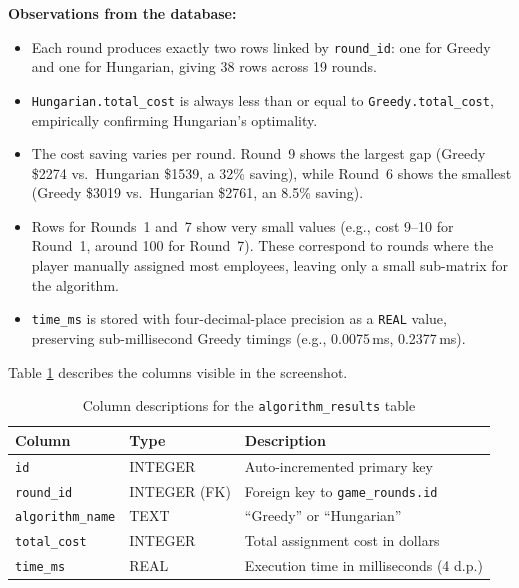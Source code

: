 \documentclass[12pt,a4paper]{article}
\begin{document}
\noindent
\textbf{Observations from the database:}
\begin{itemize}
    \item Each round produces exactly two rows linked by \texttt{round\_id}:
          one for Greedy and one for Hungarian, giving 38 rows across 19 rounds.
    \item \texttt{Hungarian.total\_cost} is always less than or equal to
          \texttt{Greedy.total\_cost}, empirically confirming Hungarian's optimality.
    \item The cost saving varies per round. Round~9 shows the largest gap
          (Greedy \$2274 vs.\ Hungarian \$1539, a 32\% saving), while Round~6 shows
          the smallest (Greedy \$3019 vs.\ Hungarian \$2761, an 8.5\% saving).
    \item Rows for Rounds~1 and~7 show very small values (e.g., cost 9--10 for
          Round~1, around 100 for Round~7). These correspond to rounds where the
          player manually assigned most employees, leaving only a small sub-matrix
          for the algorithm.
    \item \texttt{time\_ms} is stored with four-decimal-place precision as a
          \texttt{REAL} value, preserving sub-millisecond Greedy timings (e.g.,
          0.0075\,ms, 0.2377\,ms).
\end{itemize}

\noindent
Table \ref{tab:db-schema} describes the columns visible in the screenshot.

\begin{table}[H]
    \centering
    \caption{Column descriptions for the \texttt{algorithm\_results} table}
    \label{tab:db-schema}
    \begin{tabularx}{\linewidth}{llX}
        \toprule
        \textbf{Column}          & \textbf{Type}    & \textbf{Description}                             \\
        \midrule
        \texttt{id}              & INTEGER          & Auto-incremented primary key                     \\
        \texttt{round\_id}       & INTEGER (FK)     & Foreign key to \texttt{game\_rounds.id}          \\
        \texttt{algorithm\_name} & TEXT             & ``Greedy'' or ``Hungarian''                      \\
        \texttt{total\_cost}     & INTEGER          & Total assignment cost in dollars                 \\
        \texttt{time\_ms}        & REAL             & Execution time in milliseconds (4 d.p.)          \\
        \bottomrule
    \end{tabularx}
\end{table}
\end{document}
